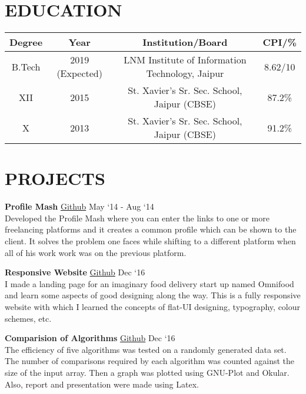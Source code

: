 \documentclass[margin]{res}
\begin{document}
\begin{resume}

\section{EDUCATION}

\begin{tabular}{|c|c|c|c|}

\hline
\textbf{Degree} & \textbf{Year} & {Institution/Board} & {CPI/\%} \\
\hline
B.Tech & 2019 (Expected) & LNM Institute of Information Technology, Jaipur & 8.62/10 \\
\hline
XII & 2015 & St. Xavier’s Sr. Sec. School, Jaipur (CBSE) & 87.2\% \\
\hline
X & 2013 & St. Xavier’s Sr. Sec. School, Jaipur (CBSE) & 91.2\% \\
\hline
\end{tabular}

\section{PROJECTS}

  {\textbf{Profile Mash}} \href{https://github.com/karanagarwal17/profile-mash}{Github} \hfill May `14 - Aug `14\\
  Developed the Profile Mash where you can enter the links to one or more freelancing platforms and it creates a common profile which can be shown to the client. It solves the problem one faces while shifting to a different platform when all of his work work was on the previous platform.

  {\textbf{Responsive Website}} \href{https://github.com/karanagarwal17/responsive-web-project}{Github} \hfill Dec `16\\
  I made a landing page for an imaginary food delivery start up named Omnifood and learn some aspects of good designing along the way. This is a fully responsive website with which I learned the concepts of flat-UI designing, typography, colour schemes, etc.

  {\textbf{Comparision of Algorithms}} \href{https://github.com/karanagarwal17/comparision-of-algorithms}{Github} \hfill Dec `16\\
  The efficiency of five algorithms was tested on a randomly generated data set. The number of comparisons required by each algorithm was counted against the size of the input array. Then a graph was plotted using GNU-Plot and Okular. Also, report and presentation were made using Latex.


\end{resume}
\end{document}
